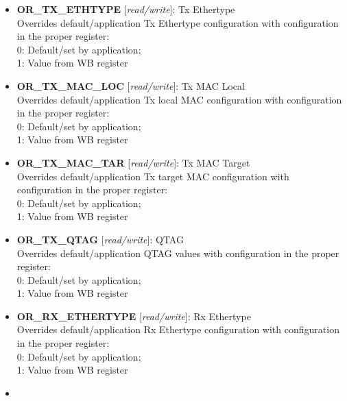 \begin{itemize}
\item \begin{small}
{\bf 
OR\_TX\_ETHTYPE
} [\emph{read/write}]: Tx Ethertype
\\
Overrides default/application Tx Ethertype configuration with configuration in the proper register:\\      0: Default/set by application; \\      1: Value from WB register
\end{small}
\item \begin{small}
{\bf 
OR\_TX\_MAC\_LOC
} [\emph{read/write}]: Tx MAC Local
\\
Overrides default/application Tx local MAC configuration with configuration in the proper register:\\      0: Default/set by application; \\      1: Value from WB register
\end{small}
\item \begin{small}
{\bf 
OR\_TX\_MAC\_TAR
} [\emph{read/write}]: Tx MAC Target
\\
Overrides default/application Tx target MAC configuration with configuration in the proper register:\\      0: Default/set by application; \\      1: Value from WB register
\end{small}
\item \begin{small}
{\bf 
OR\_TX\_QTAG
} [\emph{read/write}]: QTAG
\\
Overrides default/application QTAG values with configuration in the proper register:\\      0: Default/set by application; \\      1: Value from WB register
\end{small}
\item \begin{small}
{\bf 
OR\_RX\_ETHERTYPE
} [\emph{read/write}]: Rx Ethertype
\\
Overrides default/application Rx Ethertype configuration with configuration in the proper register:\\      0: Default/set by application; \\      1: Value from WB register
\end{small}
\item \begin{small}

\end{small}
\end{itemize}

